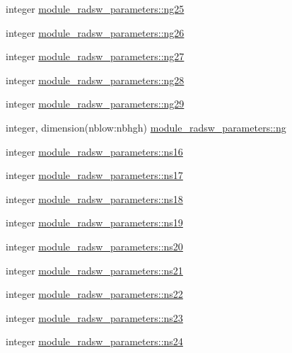 \begin{DoxyCompactItemize}
\item 
integer \hyperlink{group__module__radsw__main_ga3361783dd00dc40ee9f93c7f428c4e58}{module\+\_\+radsw\+\_\+parameters\+::ng25}
\item 
integer \hyperlink{group__module__radsw__main_gafcc02ded0358f9465eb9987226522266}{module\+\_\+radsw\+\_\+parameters\+::ng26}
\item 
integer \hyperlink{group__module__radsw__main_ga56a6dfca4ad450a5ccc910864780a971}{module\+\_\+radsw\+\_\+parameters\+::ng27}
\item 
integer \hyperlink{group__module__radsw__main_gaa2530abff6c981c3f3e70ef097f90ffc}{module\+\_\+radsw\+\_\+parameters\+::ng28}
\item 
integer \hyperlink{group__module__radsw__main_gaa53b1af0366b40653a6f0868858b9f3d}{module\+\_\+radsw\+\_\+parameters\+::ng29}
\item 
integer, dimension(nblow\+:nbhgh) \hyperlink{group__module__radsw__main_gaff9670cd3f5bef92ca998e491e28986e}{module\+\_\+radsw\+\_\+parameters\+::ng}
\item 
integer \hyperlink{group__module__radsw__main_ga3e6e310ecc531e2d0db52864468dc4a7}{module\+\_\+radsw\+\_\+parameters\+::ns16}
\item 
integer \hyperlink{group__module__radsw__main_ga08303e69e406f6bb2af252b1b7dff272}{module\+\_\+radsw\+\_\+parameters\+::ns17}
\item 
integer \hyperlink{group__module__radsw__main_ga142f7aa9f12272d721cfeae2855eec49}{module\+\_\+radsw\+\_\+parameters\+::ns18}
\item 
integer \hyperlink{group__module__radsw__main_gab666e8da69b308ae5b09e187b8153518}{module\+\_\+radsw\+\_\+parameters\+::ns19}
\item 
integer \hyperlink{group__module__radsw__main_gad63ddbb0abcaeda56220a624a62a7336}{module\+\_\+radsw\+\_\+parameters\+::ns20}
\item 
integer \hyperlink{group__module__radsw__main_ga63b1d13965acda2c131123f67fe456ea}{module\+\_\+radsw\+\_\+parameters\+::ns21}
\item 
integer \hyperlink{group__module__radsw__main_ga194fffaa7b04c97d8133a9e5686e94d5}{module\+\_\+radsw\+\_\+parameters\+::ns22}
\item 
integer \hyperlink{group__module__radsw__main_ga547ab92fedb3e35198b384f0337a752c}{module\+\_\+radsw\+\_\+parameters\+::ns23}
\item 
integer \hyperlink{group__module__radsw__main_ga3cdaa790f548b6407ba586a824c5edc6}{module\+\_\+radsw\+\_\+parameters\+::ns24}

\end{DoxyCompactItemize}
